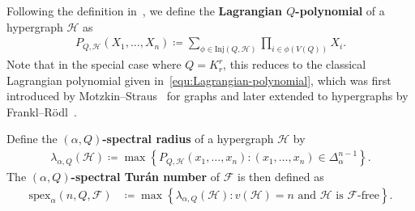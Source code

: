 \documentclass[11pt,a4paper]{article}
\begin{document}
Following the definition in~\cite{CL24}, we define the \textbf{Lagrangian $Q$-polynomial} of a hypergraph $\mathcal{H}$ as
\begin{align*}
    P_{Q,\mathcal{H}}(X_1, \ldots, X_{n})
    \coloneqq \sum_{\phi \in \mathrm{Inj}(Q,\mathcal{H})} \prod_{i\in \phi(V(Q))}X_i. 
\end{align*}
%
Note that in the special case where $Q = K_r^r$, this reduces to the classical Lagrangian polynomial given in~\eqref{equ:Lagrangian-polynomial}, which was first introduced by Motzkin--Straus~\cite{MS65} for graphs and later extended to hypergraphs by Frankl--R\"{o}dl~\cite{FR84}. 

Define the \textbf{$(\alpha, Q)$-spectral radius} of a hypergraph $\mathcal{H}$ by
\begin{align*}
    \lambda_{\alpha, Q}(\mathcal{H})
    \coloneqq \max\left\{P_{Q,\mathcal{H}}(x_1, \ldots, x_{n}) \colon (x_1, \ldots, x_{n}) \in \Delta^{n-1}_{\alpha} \right\}. 
\end{align*}
%
The \textbf{$(\alpha, Q)$-spectral Tur\'{a}n number} of $\mathcal{F}$ is then defined as 
\begin{align*}
    \mathrm{spex}_{\alpha}(n,Q,\mathcal{F})
    & \coloneqq \max\left\{\lambda_{\alpha, Q}(\mathcal{H}) \colon \text{$v(\mathcal{H}) = n$ and $\mathcal{H}$ is $\mathcal{F}$-free}\right\}.  
\end{align*}
%

\end{document}
